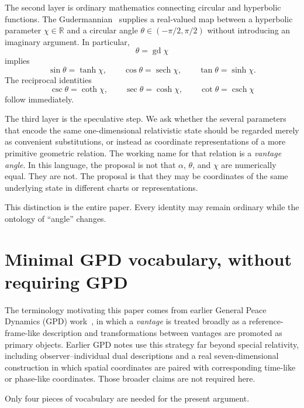 \documentclass[11pt]{article}
\DeclareMathOperator{\sech}{sech}
\DeclareMathOperator{\csch}{csch}
\DeclareMathOperator{\gd}{gd}
\begin{document}
The second layer is ordinary mathematics connecting circular and hyperbolic
functions. The Gudermannian~\cite{DLMF} supplies a real-valued map between a
hyperbolic parameter $\chi\in\mathbb{R}$ and a circular angle
$\theta\in(-\pi/2,\pi/2)$ without introducing an imaginary argument. In
particular,
\begin{equation}
\theta=\gd\chi
\label{eq:gddef}
\end{equation}
implies
\begin{equation}
\sin\theta=\tanh\chi,
\qquad
\cos\theta=\sech\chi,
\qquad
\tan\theta=\sinh\chi.
\label{eq:gdidentities}
\end{equation}
The reciprocal identities
\begin{equation}
\csc\theta=\coth\chi,
\qquad
\sec\theta=\cosh\chi,
\qquad
\cot\theta=\csch\chi
\label{eq:gdreciprocal}
\end{equation}
follow immediately.

The third layer is the speculative step. We ask whether the several
parameters that encode the same one-dimensional relativistic state should be
regarded merely as convenient substitutions, or instead as coordinate
representations of a more primitive geometric relation. The working name for
that relation is a \emph{vantage angle}. In this language, the proposal is
not that $\alpha$, $\theta$, and $\chi$ are numerically equal. They are not.
The proposal is that they may be coordinates of the same underlying state in
different charts or representations.

This distinction is the entire paper. Every identity may remain ordinary
while the ontology of ``angle'' changes.

\section{Minimal GPD vocabulary, without requiring GPD}

The terminology motivating this paper comes from earlier General Peace
Dynamics (GPD) work~\cite{MunroGPD}, in which a \emph{vantage} is treated
broadly as a reference-frame-like description and transformations between
vantages are promoted as primary objects. Earlier GPD notes use this strategy
far beyond special relativity, including observer--individual dual
descriptions and a real seven-dimensional construction in which spatial
coordinates are paired with corresponding time-like or phase-like
coordinates. Those broader claims are not required here.

Only four pieces of vocabulary are needed for the present argument.
\end{document}
